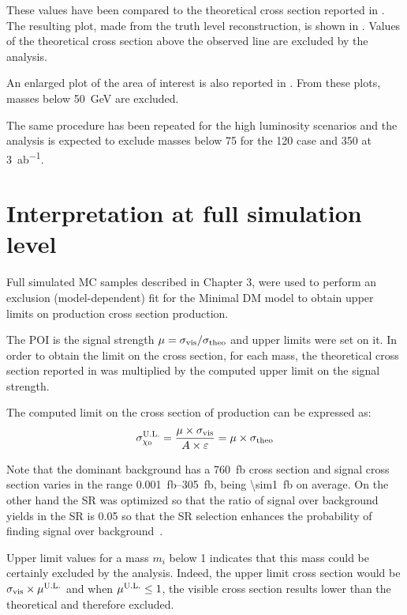 These values have been compared to the  theoretical cross section reported in \Tab{\ref{tab:eff}}. The resulting plot, made from the truth level reconstruction, is shown in \Fig{\ref{subfig:exclMI}}. Values of the  theoretical cross section above the observed line are excluded by the analysis.

An enlarged plot of the area of interest is also reported in  \Fig{\ref{subfig:exclMIZ}}. From these plots, \chizero masses below \SI{50}{\GeV} are excluded.

The same procedure has been repeated for the high luminosity scenarios and the analysis is expected to exclude masses below \SI{75}{\gev} for the \SI{120}{\ifb} case and \SI{350}{\gev} at \SI{3}{ab^{-1}}. 

\section{Interpretation at full simulation level}
\label{sec:full}
Full simulated MC samples described in Chapter 3, were used to perform an exclusion (model-dependent) fit for the Minimal DM model to obtain upper limits on \chizero production cross section production.

The POI is the signal strength $\mu=\sigma_\textup{{vis}}/\sigma_{\textup{theo}}$ and upper limits were set on it. In order to obtain the limit on the cross section, for each mass, the theoretical cross section reported in \Tab{\ref{tab:eff}} was multiplied by the computed upper limit on the signal strength. 

The computed limit on the cross section of \chizero production can be expressed as:
\begin{equation}
	\sigma_{\chi_0}^\textup{U.L.}=\frac{\mu\times\sigma_\textup{vis}}{A\times\epsilon}=\mu\times\sigma_\textup{theo}
\end{equation}

Note that the dominant background \znng has a \SI{760}{fb} cross section and signal cross section varies in the range \SIrange{0.001}{305}{fb}, being \SI{\sim1}{fb} on average. On the other hand the SR was optimized so that the ratio of signal over background yields in the SR is \num{0.05} so that the SR selection enhances the probability of finding signal over background~\cite{mgiulia}.

Upper limit values for a mass $m_i$ below \num{1} indicates that this mass could be certainly excluded by the analysis. Indeed, the upper limit cross section would be $\sigma_\textup{vis}\times \mu^\textup{U.L.}$ and when $\mu^\textup{U.L.} \le 1$, the visible cross section results lower than the  theoretical and therefore excluded.

